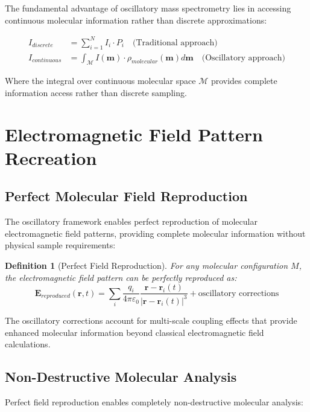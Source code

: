 \documentclass[12pt,a4paper]{article}
\newtheorem{definition}[theorem]{Definition}
\begin{document}
The fundamental advantage of oscillatory mass spectrometry lies in accessing continuous molecular information rather than discrete approximations:

\begin{align}
I_{discrete} &= \sum_{i=1}^{N} I_i \cdot P_i \quad \text{(Traditional approach)} \\
I_{continuous} &= \int_{\mathcal{M}} I(\mathbf{m}) \cdot \rho_{molecular}(\mathbf{m}) d\mathbf{m} \quad \text{(Oscillatory approach)}
\end{align}

Where the integral over continuous molecular space $\mathcal{M}$ provides complete information access rather than discrete sampling.

\section{Electromagnetic Field Pattern Recreation}

\subsection{Perfect Molecular Field Reproduction}

The oscillatory framework enables perfect reproduction of molecular electromagnetic field patterns, providing complete molecular information without physical sample requirements:

\begin{definition}[Perfect Field Reproduction]
For any molecular configuration $M$, the electromagnetic field pattern can be perfectly reproduced as:
\begin{equation}
\mathbf{E}_{reproduced}(\mathbf{r}, t) = \sum_{i} \frac{q_i}{4\pi\varepsilon_0} \frac{\mathbf{r} - \mathbf{r}_i(t)}{|\mathbf{r} - \mathbf{r}_i(t)|^3} + \text{oscillatory corrections}
\end{equation}
\end{definition}

The oscillatory corrections account for multi-scale coupling effects that provide enhanced molecular information beyond classical electromagnetic field calculations.

\subsection{Non-Destructive Molecular Analysis}

Perfect field reproduction enables completely non-destructive molecular analysis:
\end{document}
